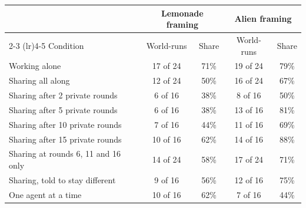 \begin{tabular}{l cc cc}
\toprule
 & \multicolumn{2}{c}{Lemonade framing} & \multicolumn{2}{c}{Alien framing} \\
\cmidrule(lr){2-3} \cmidrule(lr){4-5}
Condition & World-runs & Share & World-runs & Share \\
\midrule
Working alone & 17 of 24 & 71\% & 19 of 24 & 79\% \\
Sharing all along & 12 of 24 & 50\% & 16 of 24 & 67\% \\
Sharing after 2 private rounds & 6 of 16 & 38\% & 8 of 16 & 50\% \\
Sharing after 5 private rounds & 6 of 16 & 38\% & 13 of 16 & 81\% \\
Sharing after 10 private rounds & 7 of 16 & 44\% & 11 of 16 & 69\% \\
Sharing after 15 private rounds & 10 of 16 & 62\% & 14 of 16 & 88\% \\
Sharing at rounds 6, 11 and 16 only & 14 of 24 & 58\% & 17 of 24 & 71\% \\
Sharing, told to stay different & 9 of 16 & 56\% & 12 of 16 & 75\% \\
One agent at a time & 10 of 16 & 62\% & 7 of 16 & 44\% \\
\bottomrule
\end{tabular}